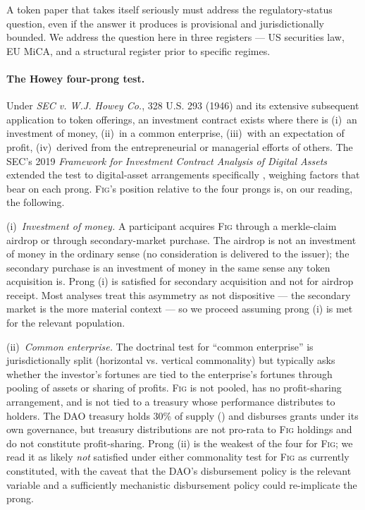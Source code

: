 \documentclass[11pt,a4paper]{article}
\theoremstyle{definition}
\theoremstyle{remark}
\newcommand{\fig}{\textsc{Fig}}
\begin{document}
A token paper that takes itself seriously must address the
regulatory-status question, even if the answer it produces is
provisional and jurisdictionally bounded. We address the
question here in three registers --- US securities law,
EU MiCA, and a structural register prior to specific regimes.

\paragraph{The Howey four-prong test.}
Under \emph{SEC v. W.J. Howey Co.}, 328 U.S. 293 (1946) and its
extensive subsequent application to token offerings, an investment
contract exists where there is (i)~an investment of money,
(ii)~in a common enterprise, (iii)~with an expectation of profit,
(iv)~derived from the entrepreneurial or managerial efforts of
others. The SEC's 2019 \emph{Framework for Investment Contract
Analysis of Digital Assets} extended the test to digital-asset
arrangements specifically \citep{sec2019framework}, weighing
factors that bear on each prong. \fig{}'s position relative to
the four prongs is, on our reading, the following.

(i)~\emph{Investment of money.} A participant acquires \fig{}
through a merkle-claim airdrop or through secondary-market
purchase. The airdrop is not an investment of money in the
ordinary sense (no consideration is delivered to the issuer);
the secondary purchase is an investment of money in the same
sense any token acquisition is. Prong (i) is satisfied for
secondary acquisition and not for airdrop receipt. Most analyses
treat this asymmetry as not dispositive --- the secondary market
is the more material context --- so we proceed assuming
prong (i) is met for the relevant population.

(ii)~\emph{Common enterprise.} The doctrinal test for ``common
enterprise'' is jurisdictionally split (horizontal vs. vertical
commonality) but typically asks whether the investor's fortunes
are tied to the enterprise's fortunes through pooling of assets
or sharing of profits. \fig{} is not pooled, has no
profit-sharing arrangement, and is not tied to a treasury whose
performance distributes to holders. The DAO treasury holds 30\%
of supply () and disburses grants under
its own governance, but treasury distributions are not pro-rata
to \fig{} holdings and do not constitute profit-sharing. Prong
(ii) is the weakest of the four for \fig{}; we read it as
likely \emph{not} satisfied under either commonality test for
\fig{} as currently constituted, with the caveat that the DAO's
disbursement policy is the relevant variable and a sufficiently
mechanistic disbursement policy could re-implicate the prong.
\end{document}
